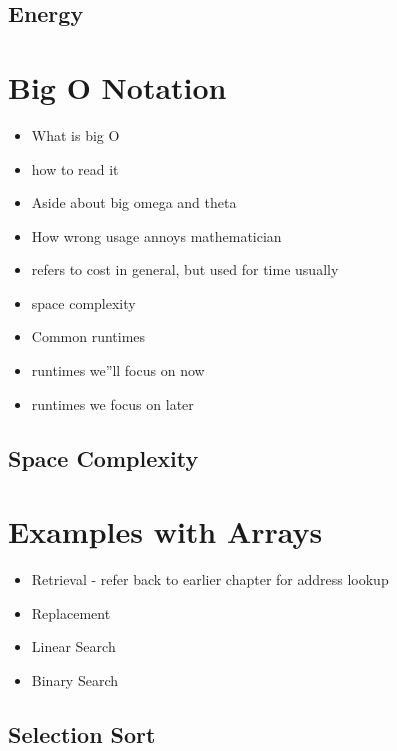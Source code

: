 \subsection{Energy}

\section{Big O Notation}

\begin{itemize}
	\item What is big O
	
	\item  how to read it
	\item Aside about big omega and theta
	\item How wrong usage annoys mathematician
	\item refers to cost in general, but used for time usually
	\item  space complexity 
	\item Common runtimes
	\item runtimes we''ll focus on now
	\item runtimes we focus on later
\end{itemize}



\subsection{Space Complexity}

\section{Examples with Arrays}

\begin{itemize}
	
	\item Retrieval  - refer back to earlier chapter for address lookup 
	\item Replacement
	\item Linear Search
	\item Binary Search
\end{itemize}



\subsection{Selection Sort}



